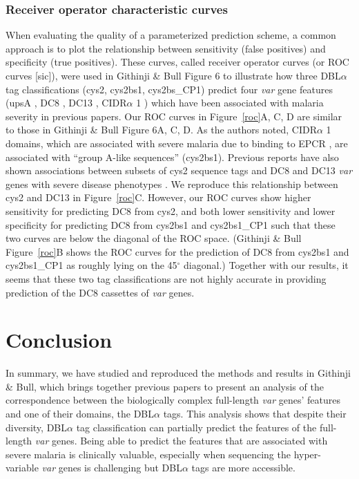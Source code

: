 \documentclass[10pt,twocolumn,superscriptaddress]{revtex4-1}
\newcommand{\var}{{\it var}\xspace}
\newcommand{\dbla}{{DBL$\alpha$}\xspace}
\newcommand{\cidra}{{CIDR$\alpha$}\xspace}
\newcommand{\paper}{{Githinji \& Bull}\xspace}
\begin{document}
\subsubsection{Receiver operator characteristic curves}
When evaluating the quality of a parameterized prediction scheme, a common approach is to plot the relationship between sensitivity (false positives) and specificity (true positives). These curves, called receiver operator curves (or ROC curves [sic]), were used in \paper Figure 6 to illustrate how three \dbla tag classifications (cys2, cys2bs1, cys2bs\_CP1) predict four \var gene features (upsA \cite{warimwe2012}, DC8 \cite{lavstsen2012} \cite{rask2010}, DC13 \cite{warimwe2012}, \cidra1 \cite{turner2013}) which have been associated with malaria severity in previous papers. Our ROC curves in Figure~\ref{roc}A, C, D are similar to those in \paper Figure 6A, C, D. As the authors noted, \cidra1 domains, which are associated with severe malaria due to binding to EPCR \cite{turner2013}, are associated with ``group A-like sequences'' (cys2bs1). Previous reports have also shown associations between subsets of cys2 sequence tags and DC8 and DC13 \var genes with severe disease phenotypes \cite{warimwe2012}. We reproduce this relationship between cys2 and DC13 in Figure~\ref{roc}C. However, our ROC curves show higher sensitivity for predicting DC8 from cys2, and both lower sensitivity and lower specificity for predicting DC8 from cys2bs1 and cys2bs1\_CP1 such that these two curves are below the diagonal of the ROC space. (\paper Figure~\ref{roc}B shows the ROC curves for the prediction of DC8 from cys2bs1 and cys2bs1\_CP1 as roughly lying on the 45$^{\circ}$ diagonal.) Together with our results, it seems that these two tag classifications are not highly accurate in providing prediction of the DC8 cassettes of \var genes. 



\section{Conclusion}
In summary, we have studied and reproduced the methods and results in \paper, which brings together previous papers to present an analysis of the correspondence between the biologically complex full-length \var genes' features and one of their domains, the \dbla tags. This analysis shows that despite their diversity, \dbla tag classification can partially predict the features of the full-length \var genes. Being able to predict the features that are associated with severe malaria is clinically valuable, especially when sequencing the hyper-variable \var genes is challenging but \dbla tags are more accessible. 
\end{document}
